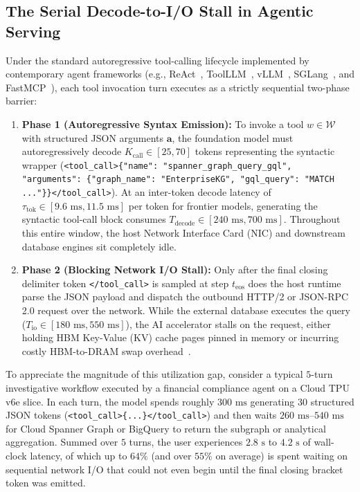 \documentclass[10pt,conference]{IEEEtran}
\begin{document}
\subsection{The Serial Decode-to-I/O Stall in Agentic Serving}
Under the standard autoregressive tool-calling lifecycle implemented by contemporary agent frameworks (e.g., ReAct~\cite{yao2023react}, ToolLLM~\cite{qin2024toolllm}, vLLM~\cite{kwon2023efficient}, SGLang~\cite{zheng2024sglang}, and FastMCP~\cite{anthropic2024mcp}), each tool invocation turn executes as a strictly sequential two-phase barrier:
\begin{enumerate}
    \item \textbf{Phase 1 (Autoregressive Syntax Emission):} To invoke a tool $w \in \mathcal{W}$ with structured JSON arguments $\mathbf{a}$, the foundation model must autoregressively decode $K_{\text{call}} \in [25, 70]$ tokens representing the syntactic wrapper (\texttt{<tool\_call>\{"name": "spanner\_graph\_query\_gql", "arguments": \{"graph\_name": "EnterpriseKG", "gql\_query": "MATCH ..."\}\}</tool\_call>}). At an inter-token decode latency of $\tau_{\text{tok}} \in [9.6\text{ ms}, 11.5\text{ ms}]$ per token for frontier models, generating the syntactic tool-call block consumes $T_{\text{decode}} \in [240\text{ ms}, 700\text{ ms}]$. Throughout this entire window, the host Network Interface Card (NIC) and downstream database engines sit completely idle.
    \item \textbf{Phase 2 (Blocking Network I/O Stall):} Only after the final closing delimiter token \texttt{</tool\_call>} is sampled at step $t_{\text{eos}}$ does the host runtime parse the JSON payload and dispatch the outbound HTTP/2 or JSON-RPC 2.0 request over the network. While the external database executes the query ($T_{\text{io}} \in [180\text{ ms}, 550\text{ ms}]$), the AI accelerator stalls on the request, either holding HBM Key-Value (KV) cache pages pinned in memory or incurring costly HBM-to-DRAM swap overhead~\cite{kwon2023efficient}.
\end{enumerate}

To appreciate the magnitude of this utilization gap, consider a typical $5$-turn investigative workflow executed by a financial compliance agent on a Cloud TPU v6e slice. In each turn, the model spends roughly $300\text{ ms}$ generating $30$ structured JSON tokens (\texttt{<tool\_call>\{...\}</tool\_call>}) and then waits $260\text{ ms}$--$540\text{ ms}$ for Cloud Spanner Graph or BigQuery to return the subgraph or analytical aggregation. Summed over $5$ turns, the user experiences $2.8\text{ s}$ to $4.2\text{ s}$ of wall-clock latency, of which up to $64\%$ (and over $55\%$ on average) is spent waiting on sequential network I/O that could not even begin until the final closing bracket token was emitted.
\end{document}
